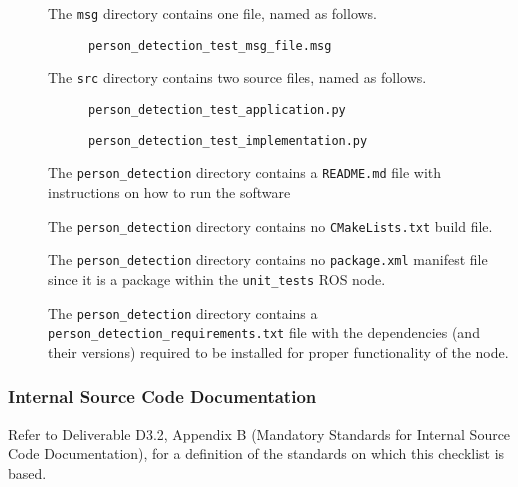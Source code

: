\documentclass{CSSRforAfrica}
\newcommand{\checkboxChecked}{\fbox{\ding{51}}} %
\newcommand{\checkboxDashed}{\fbox{--}}         %
\begin{document}
\begin{description}
\item[\checkboxChecked] The  {\small \verb+msg+} directory contains one file, named as follows.
\begin{description}
\item[\checkboxChecked] {\small \verb+person_detection_test_msg_file.msg+}  
\end{description} 

\item[\checkboxChecked] The  {\small \verb+src+} directory contains two source files, named as follows.
\begin{description}
\item[\checkboxChecked] {\small \verb+person_detection_test_application.py+}  
\item[\checkboxChecked]  {\small \verb+person_detection_test_implementation.py+}  
\end{description} 

\item[\checkboxChecked] The {\small \verb+person_detection+} directory contains  a {\small \verb+README.md+} file with  instructions on how to run the software 
\item[\checkboxChecked] The {\small \verb+person_detection+} directory contains  no {\small \verb+CMakeLists.txt+} build file.
\item[\checkboxChecked] The {\small \verb+person_detection+} directory contains  no {\small \verb+package.xml+} manifest file since it is a package within the {\small \verb+unit_tests+} ROS node.
\item[\checkboxDashed] The {\small \verb+person_detection+} directory contains  a {\small \verb+person_detection_requirements.txt+} file with the dependencies (and their versions) required to be installed for proper functionality of the node.

\end{description}

\subsubsection{Internal Source Code Documentation}
\label{subsubsection:person_detection_test_documentation_standards}  
 
Refer to Deliverable D3.2, Appendix B (Mandatory Standards for Internal Source Code Documentation), for a definition of the standards on which this checklist is based.\\
\end{document}
